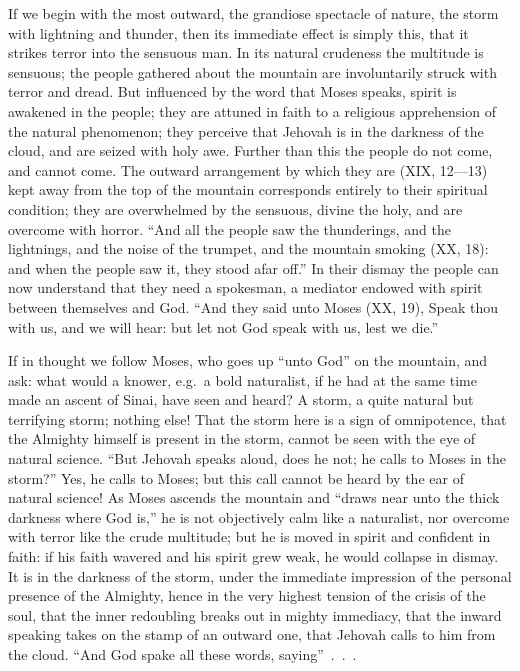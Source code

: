 \documentclass[12pt]{book}
\newcommand{\opage}[1]{\marginnote{\footnotesize\textit{[#1]}}}
\begin{document}
If we begin with the most outward, the grandiose spectacle of nature, the
storm with lightning and thunder, then its immediate effect is simply this,
that it strikes terror into the sensuous man. In its natural crudeness the
multitude is sensuous; the people gathered about the mountain are
involuntarily struck with terror and dread. But influenced by the word
that Moses speaks, spirit is awakened in the people; they are attuned in
faith to a religious apprehension of the natural phenomenon; they perceive
that Jehovah is in the
\opage{189}\setcounter{footnote}{0}%
darkness of the cloud, and are seized with holy awe. Further than this the
people do not come, and cannot come. The outward arrangement by which they
are (XIX, 12---13) kept away from the top of the mountain corresponds
entirely to their spiritual condition; they are overwhelmed by the
sensuous, divine the holy, and are overcome with horror. ``And all the
people saw the thunderings, and the lightnings, and the noise of the
trumpet, and the mountain smoking (XX, 18): and when the people saw it,
they stood afar off.'' In their dismay the people can now understand that
they need a spokesman, a mediator endowed with spirit between themselves
and God. ``And they said unto Moses (XX, 19), Speak thou with us, and we
will hear: but let not God speak with us, lest we die.''

If in thought we follow Moses, who goes up ``unto God'' on the mountain,
and ask: what would a knower, e.g.\ a bold naturalist, if he had at the
same time made an ascent of Sinai, have
seen and heard? A storm, a quite natural but terrifying storm; nothing
else! That the storm here is a sign of omnipotence, that the Almighty
himself is present in the storm, cannot be seen with the eye of natural
science. ``But Jehovah speaks aloud, does he not; he calls to Moses in the
storm?'' Yes, he calls to Moses; but this call cannot be heard by the ear
of natural science! As Moses ascends the mountain and ``draws near unto the
thick darkness where God is,'' he is not objectively calm like a
naturalist, nor overcome with terror like the crude multitude; but he is
moved in spirit and confident in faith: if his faith wavered and his spirit
grew weak, he would collapse in dismay. It is in the darkness of the storm,
under the immediate impression of the personal presence of the Almighty,
hence in the very highest tension of the crisis of the soul, that the inner
redoubling breaks out in mighty immediacy, that the inward speaking takes
on the stamp of an outward one, that Jehovah
\opage{190}\setcounter{footnote}{0}%
calls to him from the cloud. ``And God spake all these words,
saying''~.~.~.
\end{document}
